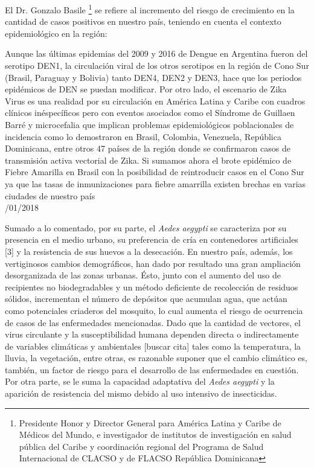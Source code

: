 \par El Dr. Gonzalo Basile \footnote{Presidente Honor y Director General para
                 América Latina y Caribe de Médicos del Mundo, e investigador de institutos de
                 investigación en salud pública del Caribe y coordinación regional del Programa
                 de Salud Internacional de CLACSO y de FLACSO República Dominicana}
     se refiere al incremento del riesgo de crecimiento
     en la cantidad de casos positivos en nuestro país, teniendo en cuenta
     el contexto epidemiológico en la región:
\begin{framed}

  Aunque las últimas epidemias del 2009 y 2016 de Dengue en Argentina fueron del
  serotipo DEN1, la circulación viral de los otros serotipos en la región de
  Cono Sur (Brasil, Paraguay y Bolivia) tanto DEN4, DEN2 y DEN3, hace que los
  periodos epidémicos de DEN se puedan modificar. Por otro lado, el escenario de
  Zika Virus es una realidad por su circulación en América Latina y Caribe con
  cuadros clínicos inéspecíficos pero con eventos asociados como el Síndrome de
  Guillaen Barré y microcefalia que implican problemas epidemiológicos
  poblacionales de incidencia como lo demostraron en Brasil, Colombia, Venezuela,
  República Dominicana, entre otros 47 países de la región donde se confirmaron
  casos de transmisión activa vectorial de Zika.
  Si sumamos ahora el brote epidémico de Fiebre Amarilla en Brasil con la
  posibilidad de reintroducir casos en el Cono Sur ya que las tasas de
  inmunizaciones para fiebre amarrilla existen brechas en varias ciudades de nuestro país \\

 /01/2018
\end{framed}



\par Sumado a lo comentado, por su parte, el \textit{Aedes aegypti} se
  caracteriza por su presencia en el medio urbano, su preferencia
  de cría en contenedores artificiales [3] y la resistencia de sus huevos a la
  desecación. En nuestro país, además, los vertiginosos cambios demográficos, han dado
  por resultado una gran ampliación desorganizada de las zonas urbanas. Ésto, junto
  con el aumento del uso de recipientes no biodegradables y un método deficiente
  de recolección de residuos sólidos, incrementan el número de depósitos que
  acumulan agua, que actúan como potenciales criaderos del mosquito, lo cual aumenta el
  riesgo de ocurrencia de casos de las enfermedades mencionadas.
  Dado que la cantidad de vectores, el virus circulante y la susceptibilidad
  humana dependen directa o indirectamente de variables climáticas y ambientales [buscar cita]
  tales como la temperatura, la lluvia, la vegetación, entre otras, es razonable
  suponer que el cambio climático es, también, un factor de riesgo para el desarrollo
  de las enfermedades en cuestión. Por otra parte, se le suma la capacidad adaptativa del
  \textit{Aedes aegypti} y la aparición de resistencia del mismo debido al uso intensivo de
  insecticidas.


